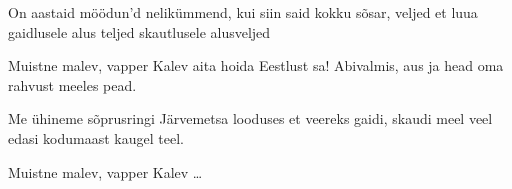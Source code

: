 On aastaid m\"o\"odun'd nelik\"ummend,
kui siin said kokku s\~osar, veljed
et luua gaidlusele alus teljed
skautlusele alusveljed

Muistne malev, vapper Kalev
aita hoida Eestlust sa!
Abivalmis, aus ja head
oma rahvust meeles pead.

Me \"uhineme s\~oprusringi
J\"arvemetsa looduses
et veereks gaidi, skaudi meel veel
edasi kodumaast kaugel teel.

Muistne malev, vapper Kalev \ldots